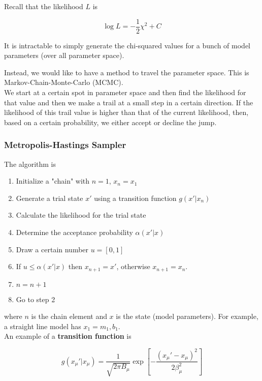 \documentclass[]{article}
\begin{document}
Recall that the likelihood $L$ is

\[\log L = -\frac{1}{2}\chi^2 + C\]


It is intractable to simply generate the chi-squared values for a bunch of model parameters (over all parameter space). 


Instead, we would like to have a method to travel the parameter space. This is Markov-Chain-Monte-Carlo (MCMC).\\

We start at a certain spot in parameter space and then find the likelihood for that value and then we make a trail at a small step in a certain direction. If the likelihood of this trail value is higher than that of the current likelihood, then, based on a certain probability, we either accept or decline the jump.\\

\subsubsection{Metropolis-Hastings Sampler}\bigbreak

The algorithm is

\begin{enumerate}
	\item Initialize a "chain" with $n=1$, $x_n = x_1$
	\item Generate a trial state $x'$ using a transition function $g(x' | x_n)$
	\item Calculate the likelihood for the trial state
	\item Determine the acceptance probability $\alpha(x'|x)$
	\item Draw a certain number $u = [0, 1]$
	\item If $u \leq \alpha(x'|x)$ then $x_{n+1} = x'$, otherwise $x_{n+1} = x_n$.
	\item $n = n+1$
	\item Go to step 2 
\end{enumerate}\bigbreak

where $n$ is the chain element and $x$ is the state (model parameters). For example, a straight line model has $x_1 = {m_1, b_1}$.\\

An example of a \textbf{transition function} is 

\[g(x_\mu' | x_\mu) = \frac{1}{\sqrt{2\pi B_\mu}}\exp\left[-\frac{(x_\mu' - x_\mu)^2}{2\beta_\mu^2} \right]\]
 
\end{document}
